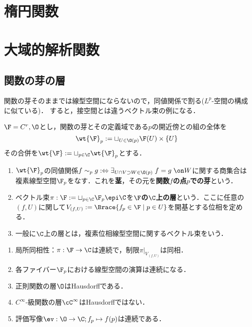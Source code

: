 \documentclass[uplatex, dvipdfmx]{jsreport}
\begin{document}
\chapter{楕円関数}

\chapter{大域的解析関数}

\section{関数の芽の層}

\begin{tcolorbox}[colframe=ForestGreen, colback=ForestGreen!10!white,breakable,colbacktitle=ForestGreen!40!white,coltitle=black,fonttitle=\bfseries\sffamily,
title=]
    関数の芽そのままでは線型空間にならないので，同値関係で割る($L^p$-空間の構成に似ている)．
    すると，接空間とは違うベクトル束の例になる．
\end{tcolorbox}

\begin{notation}[関数の芽の全体]
    $\F=C^r,\O$とし，関数の芽とその定義域である$p$の開近傍との組の全体を
    \[\wt{\F}_p:=\sqcup_{U\in\O(p)}\F(U)\times\{U\}\]
    その合併を$\wt{\F}:=\sqcup_{p\in\C}\wt{\F}_p$とする．
\end{notation}

\begin{definition}\mbox{}
    \begin{enumerate}
        \item $\wt{\F}_p$の同値関係$f\sim_pg:\Leftrightarrow\exists_{U\cap V\supset W\in\O(p)}\;f=g\;\on W$に関する商集合は複素線型空間$\F_p$をなす．これを\textbf{茎}，その元を\textbf{関数$f$の点$p$での芽}という．
        \item ベクトル束$\pi:\F:=\sqcup_{p\in\C}\F_p\epi\C$を\textbf{$\F$の$\C$上の層}という．ここに任意の$(f,U)$に関して$V_{(f,U)}:=\Brace{f_p\in\F\mid p\in U}$を開基とする位相を定める．
        \item 一般に$\C$上の層とは，複素位相線型空間に関するベクトル束をいう．
    \end{enumerate}
\end{definition}

\begin{proposition}\mbox{}
    \begin{enumerate}
        \item 局所同相性：$\pi:\F\to\C$は連続で，制限$\pi|_{V_{(f,U)}}$は同相．
        \item 各ファイバー$\F_p$における線型空間の演算は連続になる．
        \item 正則関数の層$\O$はHausdorffである．
        \item $C^\infty$-級関数の層$\cC^\infty$はHausdorffではない．
        \item 評価写像$\ev:\O\to\C;f_p\mapsto f(p)$は連続である．
    \end{enumerate}
\end{proposition}
\end{document}
